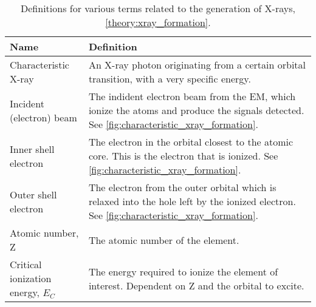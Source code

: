 \begin{table}[phb]
    \begin{center}
        \caption{
            Definitions for various terms related to the generation of X-rays, \cref{theory:xray_formation}.
        }
        \renewcommand*{\arraystretch}{1.4}
        \label{tab:xray_generation}
        \begin{tabular}{p{3cm}p{11.6cm}}
            \hline
            \textbf{Name}                        & \textbf{Definition}                                                                                                                                                                                         \\
            \hline
            Characteristic X-ray                 & An X-ray photon originating from a certain orbital transition, with a very specific energy.                                                                                                                 \\
            Incident (electron) beam             & The indident electron beam from the EM, which ionize the atoms and produce the signals detected. See  \cref{fig:characteristic_xray_formation}.                                                             \\
            Inner shell electron                 & The electron in the orbital closest to the atomic core. This is the electron that is ionized. See  \cref{fig:characteristic_xray_formation}.                                                                \\
            Outer shell electron                 & The electron from the outer orbital which is relaxed into the hole left by the ionized electron. See  \cref{fig:characteristic_xray_formation}.                                                             \\
            Atomic number, Z                     & The atomic number of the element.                                                                                                                                                                           \\
            Critical ionization energy, $E_C$    & The energy required to ionize the element of interest. Dependent on Z and the orbital to excite.                                                                                                            \\

\end{tabular}
\end{center}
\end{table}
